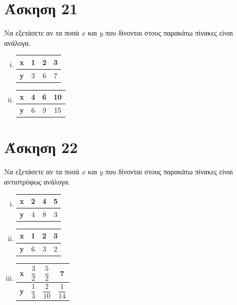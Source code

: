 \documentclass[a4paper,10pt]{report}
\begin{document}
\section*{Άσκηση 21  \hfill \small{}}
Να εξετάσετε αν τα ποσά $x$ και $y$ που δίνονται στους παρακάτω πίνακες είναι ανάλογα.
\begin{enumerate}[i)]
 \item 
 \begin{center}
\begin{tabular}{|c|c|c|c|}\hline
\textbf{x} & 1 & 2 & 3 \\\hline
\textbf{y} & 3 & 6 & 7 \\\hline
\end{tabular}
\end{center}
 
 \item 
  \begin{center}
\begin{tabular}{|c|c|c|c|}\hline
\textbf{x} & 4 & 6 & 10 \\\hline
\textbf{y} & 6 & 9 & 15 \\\hline
\end{tabular}
\end{center}
\end{enumerate}

\section*{Άσκηση 22  \hfill \small{}}
Να εξετάσετε αν τα ποσά $x$ και $y$ που δίνονται στους παρακάτω πίνακες είναι αντιστρόφως ανάλογα.
\begin{enumerate}[i)]
 \item 
  \begin{center}
\begin{tabular}{|c|c|c|c|}\hline
\textbf{x} & 2 & 4 & 5 \\\hline
\textbf{y} & 4 & 8 & 3 \\\hline
\end{tabular}
\end{center}
 \item 
  \begin{center}
\begin{tabular}{|c|c|c|c|}\hline
\textbf{x} & 1 & 2 & 3 \\\hline
\textbf{y} & 6 & 3 & 2 \\\hline
\end{tabular}
\end{center}
 \item 
  \begin{center}
\begin{tabular}{|c|c|c|c|}\hline
\textbf{x} & $\dfrac{3}{2}$  & $\dfrac{5}{2}$  & 7 \\\hline
\textbf{y} & $\dfrac{1}{3}$  & $\dfrac{2}{10}$ & $\dfrac{1}{14}$ \\\hline
\end{tabular}
\end{center}
\end{enumerate}
\end{document}
